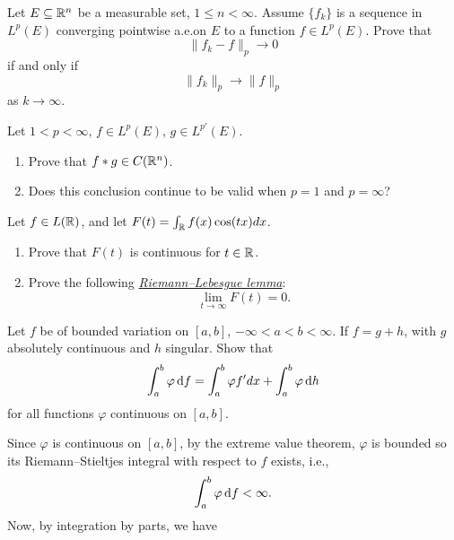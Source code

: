 \begin{problem}
  Let \(E\subseteq\mathbb{R}^n\) be a measurable set, \(1\leq n<\infty\). Assume
  \(\{f_k\}\) is a sequence in \(L^p(E)\) converging pointwise a.e.\@ on
  \(E\) to a function \(f\in L^p(E)\). Prove that
  \[
    \|{f_k-f}\|_p\longrightarrow 0
  \]
  if and only if
  \[
    \|{f_k}\|_p\longrightarrow\|f\|_p
  \]
  as \(k\to\infty\).
\end{problem}
\begin{solution}
\end{solution}

\begin{problem}
  Let \(1<p<\infty\), \(f\in L^p(E)\), \(g\in L^{p'}(E)\).
  \begin{enumerate}[label=(\alph*)]
  \item Prove that \(f*g\in C(\mathbb{R}^n)\).
  \item Does this conclusion continue to be valid when \(p=1\) and
    \(p=\infty\)?
  \end{enumerate}
\end{problem}
\begin{solution}
\end{solution}

\begin{problem}
  Let \(f\in L(\mathbb{R})\), and let \(F(t)=\int_{\mathbb{R}}f(x)\cos(tx)dx\).
  \begin{enumerate}[label=(\alph*)]
  \item Prove that \(F(t)\) is continuous for \(t\in\mathbb{R}\).
  \item Prove the following
    \href{https://en.wikipedia.org/wiki/Riemann–Lebesgue_lemma}{\emph{Riemann--Lebesgue
        lemma}}:
    \[
      \lim_{t\to\infty}F(t)=0.
    \]
\end{enumerate}
\end{problem}
\begin{solution}
\end{solution}

\begin{problem}
  Let \(f\) be of bounded variation on \([a,b]\),
  \(-\infty<a<b<\infty\). If \(f=g+h\), with \(g\) absolutely continuous
  and \(h\) singular. Show that
  \[
    \int_a^b\varphi \mathop{}\!\mathrm{d} f=\int_a^b\varphi f'dx+\int_a^b\varphi \mathop{}\!\mathrm{d} h
  \]
  for all functions \(\varphi\) continuous on \([a,b]\).
\end{problem}
\begin{solution}
  Since \(\varphi\) is continuous on \([a,b]\), by the extreme value
  theorem, \(\varphi\) is bounded so its Riemann--Stieltjes integral with
  respect to \(f\) exists, i.e.,
  \[
    \int_a^b \varphi\mathop{}\!\mathrm{d} f<\infty.
  \]
  Now, by integration by parts, we have
\end{solution}

